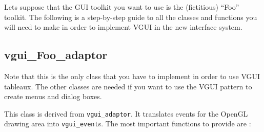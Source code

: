 \documentclass[12pt]{report} \usepackage{epsfig}
\begin{document}
Lets suppose that the GUI toolkit you want to use is the (fictitious) ``Foo'' toolkit.
The following is a step-by-step guide to all the classes and functions you will need to
make in order to implement VGUI in the new interface system.

\subsection{vgui\_Foo\_adaptor}

Note that this is the only class that you have to implement in order to use VGUI tableaux.
The other classes are needed if you want to use the VGUI pattern to create menus and dialog
boxes.

This class is derived from {\tt vgui\_adaptor}.  It translates events for the OpenGL drawing
area into {\tt vgui\_event}s. The most important functions to provide are :
\end{document}
